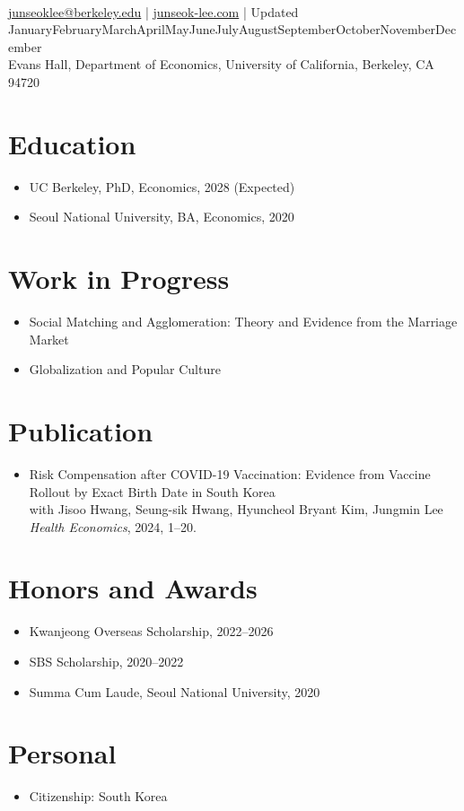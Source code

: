 \documentclass[11pt,letterpaper]{article}
\begin{document}
\thispagestyle{empty}

 \\[8pt]
\noindent\href{mailto:junseoklee@berkeley.edu}{junseoklee@berkeley.edu} \quad | \quad \href{https://junseok-lee.com}{junseok-lee.com} \quad | \quad Updated \ifcase\month\or January\or February\or March\or April\or May\or June\or July\or August\or September\or October\or November\or December\fi{} \the\year \\[2pt]
 Evans Hall, Department of Economics, University of California, Berkeley, CA 94720

\section*{Education}
\begin{itemize}[leftmargin=*, nosep]
    \item UC Berkeley, PhD, Economics, 2028 (Expected)
    \item Seoul National University, BA, Economics, 2020
\end{itemize}

\section*{Work in Progress}
\begin{itemize}[leftmargin=*, nosep]
    \item Social Matching and Agglomeration: Theory and Evidence from the Marriage Market
    \item Globalization and Popular Culture
\end{itemize}

\section*{Publication}
\begin{itemize}[leftmargin=*, nosep]
    \item Risk Compensation after COVID-19 Vaccination: Evidence from Vaccine Rollout by Exact Birth Date in South Korea \\
    with Jisoo Hwang, Seung-sik Hwang, Hyuncheol Bryant Kim, Jungmin Lee \\
    \textit{Health Economics}, 2024, 1--20.
\end{itemize}

\section*{Honors and Awards}
\begin{itemize}[leftmargin=*, nosep]
    \item Kwanjeong Overseas Scholarship, 2022--2026
    \item SBS Scholarship, 2020--2022
    \item Summa Cum Laude, Seoul National University, 2020
\end{itemize}

\section*{Personal}
\begin{itemize}[leftmargin=*, nosep]
    \item Citizenship: South Korea
\end{itemize}
\end{document}
